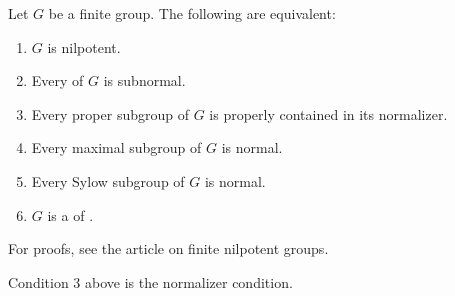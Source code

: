 \documentclass[12pt]{article}
\begin{document}

Let $G$ be a finite group.  The following are equivalent:
\begin{enumerate}
\item $G$ is nilpotent.
\item Every  of $G$ is subnormal.
\item Every proper subgroup of $G$ is properly contained in its normalizer.
\item Every maximal subgroup of $G$ is normal.
\item Every Sylow subgroup of $G$ is normal.
\item $G$ is a  of .
\end{enumerate}

For proofs, see the article on finite nilpotent groups.

Condition 3 above is the normalizer condition.
\end{document}
